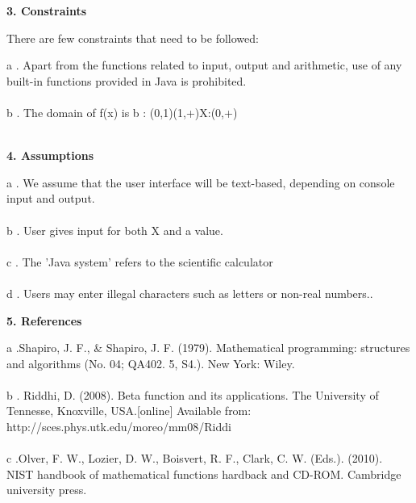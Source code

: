 \documentclass[12pt,letterpaper]{article}
\begin{document}
	\begin{flushleft}
		\large\textbf{3. Constraints}
	\end{flushleft}
    There are few constraints that need to be followed:
		
		\begin{itemize}
			{a .} Apart from the functions related to input, output and arithmetic, use of any built-in functions provided in Java is prohibited. \\
			\\
			{b .} The domain of f(x) is b : (0,1)\cup(1,+\infty)\quad X:(0,+\infty)\\   
			\\
		\end{itemize}
	\begin{flushleft}
		\large\textbf{4. Assumptions}
	\end{flushleft}
	    \begin{itemize}
			{a .} We assume that the user interface will be text-based, depending on console input and output. \\
			\\
			{b .} User gives input for both X and a value. \\
			\\
			{c .} The 'Java system' refers to the scientific calculator\\
			\\
			{d .} Users may enter illegal characters such as letters or non-real numbers..\\
		\end{itemize}
	
	\begin{flushleft}
		\large\textbf{5. References}
	\end{flushleft}
		\begin{enumerate}
			{a .}Shapiro, J. F., & Shapiro, J. F. (1979). Mathematical programming: structures and algorithms (No. 04; QA402. 5, S4.). New York: Wiley.\\
			\\
			{b .} Riddhi, D. (2008). Beta function and its applications. The University of Tennesse, Knoxville, USA.[online] Available from: http://sces.phys.utk.edu/moreo/mm08/Riddi\\
			\\
			{c .}Olver, F. W., Lozier, D. W., Boisvert, R. F., Clark, C. W. (Eds.). (2010). NIST handbook of mathematical functions hardback and CD-ROM. Cambridge university press.

		\end{enumerate}
\newpage
\end{document}

